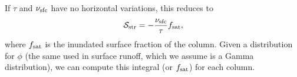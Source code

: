 \documentclass[twoside,10pt]{report}
\begin{document}
If $\tau$ and $\nu_{\rm sfc}$ have no horizontal variations, this reduces to
\begin{align}
        \mathcal{S_{\rm str}} = - \frac{\nu_{\rm sfc}}{\tau}f_{\rm sat},
\end{align}
where $f_{\rm sat}$ is the inundated surface fraction of the column. Given a distribution for $\phi$ (the same used in surface runoff, which we assume is a Gamma distribution), we can compute this integral (or $f_{\rm sat}$) for each column. 




\end{document}
